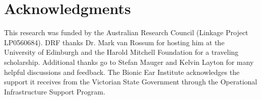 \documentclass[11pt,draftcls,onecolumn]{IEEEtran}
\begin{document}
\section*{Acknowledgments}
This research was funded by the Australian Research Council (Linkage Project LP0560684). DRF thanks Dr. Mark van Rossum for hosting him at the University of Edinburgh and the Harold Mitchell Foundation for a traveling scholarship. Additional thanks go to Stefan Mauger and Kelvin Layton for many helpful discussions and feedback. The Bionic Ear Institute acknowledges the support it receives from the Victorian State Government through the Operational Infrastructure Support Program. 







%

% 
% 
% 
% 
% 
% 

\end{document}
